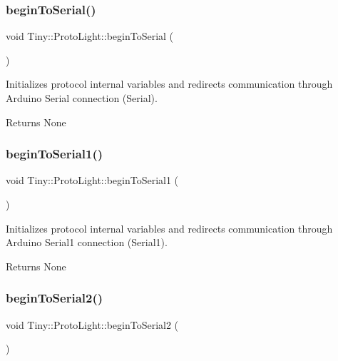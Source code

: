 \subsubsection{\texorpdfstring{begin\+To\+Serial()}{beginToSerial()}}
{\footnotesize\ttfamily void Tiny\+::\+Proto\+Light\+::begin\+To\+Serial (\begin{DoxyParamCaption}{ }\end{DoxyParamCaption})}

Initializes protocol internal variables and redirects communication through Arduino Serial connection (Serial). \begin{DoxyReturn}{Returns}
None 
\end{DoxyReturn}
\mbox{\label{classTiny_1_1ProtoLight_a4de4d11cc7f68dcefa5ca1357e6dfc35}} 
\subsubsection{\texorpdfstring{begin\+To\+Serial1()}{beginToSerial1()}}
{\footnotesize\ttfamily void Tiny\+::\+Proto\+Light\+::begin\+To\+Serial1 (\begin{DoxyParamCaption}{ }\end{DoxyParamCaption})\hspace{0.3cm}{\ttfamily [inline]}}

Initializes protocol internal variables and redirects communication through Arduino Serial1 connection (Serial1). \begin{DoxyReturn}{Returns}
None 
\end{DoxyReturn}
\mbox{\label{classTiny_1_1ProtoLight_a40a4d002f53c842b1a3577a8a9c8eebb}} 
\subsubsection{\texorpdfstring{begin\+To\+Serial2()}{beginToSerial2()}}
{\footnotesize\ttfamily void Tiny\+::\+Proto\+Light\+::begin\+To\+Serial2 (\begin{DoxyParamCaption}{ }\end{DoxyParamCaption})\hspace{0.3cm}{\ttfamily [inline]}}

